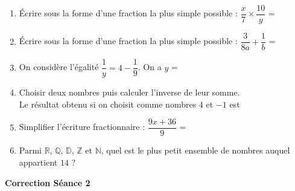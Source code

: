 \documentclass[a4paper,11pt]{article}
\begin{document}
\vspace*{2cm}
\begin{seanceD}{} %

\begin{enumerate}
\item Écrire sous la forme d'une fraction la plus simple possible : $\dfrac{x}{7}\times \dfrac{10}{y}$ = \dotfill

\item Écrire sous la forme d'une fraction la plus simple possible : $\dfrac{3}{8a}+\dfrac{1}{b}$ = \dotfill

\item On considère l'égalité $\dfrac{1}{y}=4-\dfrac{1}{9}$. On a $y$ = \dotfill

\item Choisir deux nombres puis calculer l'inverse de leur somme.\\
 Le résultat obtenu si on choisit comme nombres $4$ et $-1$ est \dotfill

\item Simplifier l'écriture fractionnaire : $\dfrac{9x+36}{9}$ = \dotfill

\item Parmi $\mathbb{R}$, $\mathbb{Q}$, $\mathbb{D}$, $\mathbb{Z}$ et $\mathbb{N}$, quel est le plus petit ensemble de nombres auquel appartient $14$ ?

\dotfill

\end{enumerate}

\end{seanceD} %
\vspace{0.5cm}
\begin{center}

\textbf{\textcolor{Couleur8}{Correction Séance 2}}\\
\vspace{2mm}

\end{center}
\newpage
\vspace*{1cm}
\end{document}
